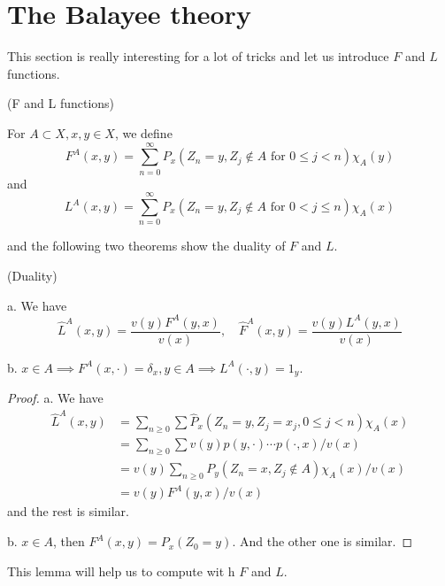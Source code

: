 \documentclass[lang=en,11pt,a4paper,citestyle =authoryear]{elegantpaper}
\begin{document}
\newpage

\section{The Balayee theory}

This section is really interesting for a lot of tricks and let us introduce $F$ and $L$ functions.

\begin{definition}
    (F and L functions)\par
    For $A\subset X, x,y \in X$, we define
    \[
    F^A(x,y) = \sum\limits_{n=0}^{\infty}P_x(Z_n = y, Z_j \notin A\text{ for }0\leq j < n)\chi_A(y)
    \]
    and
    \[
    L^A(x,y) = \sum\limits_{n=0}^{\infty}P_x(Z_n = y, Z_j \notin A\text{ for }0<j\leq n)\chi_A(x)
   \]
\end{definition}

and the following two theorems show the duality of $F$ and $L$.

\begin{theorem}(Duality)\par
    a. We have
    \[
    \hat{L}^A(x,y) = \dfrac{v(y)F^A(y,x)}{v(x)},\quad \hat{F}^A(x,y) = \dfrac{v(y)L^A(y,x)}{v(x)}
    \]\par
    b. $x\in A \implies F^A(x,\cdot) = \delta_x, y\in A \implies L^A(\cdot,y) = 1_y$.
\end{theorem}
\begin{proof}
    a. We have
    \[
    \begin{aligned}
        \hat{L}^A(x,y) &= \sum\limits_{n\geq 0}\sum \hat{P}_x(Z_n = y, Z_j = x_j, 0\leq j < n)\chi_A(x) \\
        &= \sum\limits_{n\geq 0}\sum v(y)p(y,\cdot)\cdots p(\cdot,x)/v(x) \\
        &= v(y)\sum\limits_{n\geq 0}P_y(Z_n=x,Z_j\notin A)\chi_A(x)/v(x) \\
        &= v(y)F^A(y,x)/v(x)
    \end{aligned} 
    \]
    and the rest is similar.\par
    b. $x\in A$, then $F^A(x,y) = P_x(Z_0 = y)$. And the other one is similar.
\end{proof}

This lemma will help us to compute wit h $F$ and $L$.\par
\end{document}
